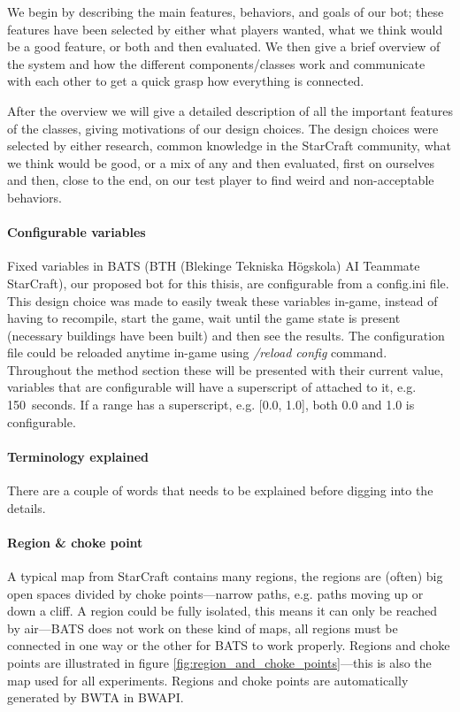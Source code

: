 We begin by describing the main features, behaviors, and goals of our bot; these features have been selected by either what players wanted, what we think would be a good feature, or both and then evaluated. We then give a brief overview of the system and how the different components/classes work and communicate with each other to get a quick grasp how everything is connected.

After the overview we will give a detailed description of all the important features of the classes, giving motivations of our design choices. The design choices were selected by either research, common knowledge in the StarCraft community, what we think would be good, or a mix of any and then evaluated, first on ourselves and then, close to the end, on our test player to find weird and non-acceptable behaviors.

\paragraph{Configurable variables}
Fixed variables in BATS (BTH (Blekinge Tekniska Högskola) AI Teammate StarCraft), our proposed
bot for this thisis, are
configurable from a config.ini file. This design choice was made to easily tweak these variables
in-game, instead of having to recompile, start the game, wait until the game state is present
(necessary buildings have been built) and then see the results. The configuration file could be
reloaded anytime in-game using \emph{/reload config} command. Throughout the method section these
will be presented with their current value, variables that are configurable will have a superscript
of \conf attached to it, e.g. 150\conf~seconds. If a range has a superscript, e.g. [0.0, 1.0]\conf,
both 0.0 and 1.0 is configurable.

\paragraph{Terminology explained}
There are a couple of words that needs to be explained before digging into the details.

\paragraph{Region \& choke point} A typical map from StarCraft contains many regions, the regions
are (often) big open spaces divided by choke points—narrow paths, e.g. paths moving up or down a
cliff. A region could be fully isolated, this means it can only be reached by air—BATS does not work
on these kind of maps, all regions must be connected in one way or the other for BATS to work
properly. Regions and choke points are illustrated in figure \ref{fig:region_and_choke_points}—this
is also the map used for all experiments. Regions and choke points are automatically generated by
BWTA\cite{bwta} in BWAPI\cite{bwapi}.
